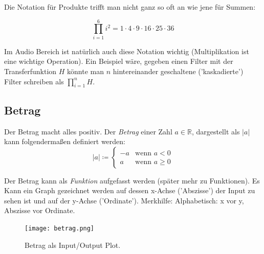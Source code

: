 

Die Notation für Produkte trifft man nicht ganz so oft an wie jene für Summen:

\begin{equation}
{\displaystyle \prod _{i=1}^{6}i^{2} =  1\cdot 4\cdot 9\cdot 16\cdot 25\cdot 36}
\end{equation}

Im Audio Bereich ist natürlich auch diese Notation wichtig (Multiplikation ist eine wichtige Operation). Ein Beispiel wäre, gegeben einen Filter mit der Transferfunktion $H$ könnte man $n$ hintereinander geschaltene ('kaskadierte') Filter schreiben als $\prod _{i=1}^{n}H$.


\subsection{Betrag}


Der Betrag macht alles positiv. Der \emph{Betrag} einer Zahl $a \in \mathbb{R}$, dargestellt als $|a|$ kann folgendermaßen definiert werden:
$$ 
|a| \coloneqq
\begin{cases} 
-a & \text{wenn } a < 0 \\ 
a & \text{wenn } a \geq 0 
\end{cases}
$$ 

Der Betrag kann als \emph{Funktion} aufgefasst werden (später mehr zu Funktionen). Es Kann ein Graph gezeichnet werden auf dessen x-Achse ('Abszisse') der Input zu sehen ist und auf der y-Achse ('Ordinate'). Merkhilfe: Alphabetisch: x vor y, Abszisse vor Ordinate.



\begin{figure}[h!]
    \centering
    \texttt{[image: betrag.png]}
    \caption{Betrag als Input/Output Plot.}
    \label{fig:betrag}
\end{figure}




